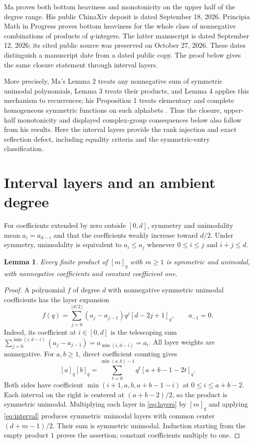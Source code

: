 \documentclass[11pt]{article}
\newtheorem{lemma}{Lemma}
\newcommand{\qi}[1]{[#1]_q}
\begin{document}
Ma \cite{Ma} proves both bottom heaviness and monotonicity
on the upper half of the degree range. His public ChinaXiv deposit is dated
September 18, 2026. Principia Math in Progress
\cite[Lemmas 1--2 and Theorem 1]{PM} proves bottom heaviness for the
whole class of nonnegative combinations of products of $q$-integers.
The latter manuscript is dated September 12, 2026; its cited public
source was preserved on October 27, 2026. These dates distinguish a
manuscript date from a dated public copy. The proof below gives the
same closure statement through interval layers.

More precisely, Ma's Lemma 2 treats any nonnegative sum of symmetric
unimodal polynomials, Lemma 3 treats their products, and Lemma 4 applies
this mechanism to recurrences; his Proposition 1 treats elementary and
complete homogeneous symmetric functions on such alphabets
\cite[pp.~8--12]{Ma}. Thus the closure, upper-half monotonicity and
displayed complex-group consequences below also follow from his results.
Here the interval layers provide the rank injection and exact reflection
defect, including equality criteria and the symmetric-entry classification.

\section{Interval layers and an ambient degree}
For coefficients extended by zero outside $[0,d]$, symmetry and
unimodality mean $a_i=a_{d-i}$ and that the coefficients weakly
increase toward $d/2$. Under symmetry, unimodality is equivalent to
$a_i\le a_j$ whenever
$0\le i\le j$ and $i+j\le d$.

\begin{lemma}\label{lem:products}
Every finite product of $\qi{m}$ with $m\ge1$ is symmetric and
unimodal, with nonnegative coefficients and constant coefficient one.
\end{lemma}
\begin{proof}
A polynomial $f$ of degree $d$ with nonnegative symmetric unimodal
coefficients has the layer expansion
\begin{equation}\label{eq:layers}
 f(q)=\sum_{j=0}^{\lfloor d/2\rfloor}
 (a_j-a_{j-1})q^j\qi{d-2j+1},\qquad a_{-1}=0.
\end{equation}
Indeed, its coefficient at $i\in[0,d]$ is the telescoping sum
$\sum_{j=0}^{\min(i,d-i)}(a_j-a_{j-1})=a_{\min(i,d-i)}=a_i$.
All layer weights are nonnegative. For $a,b\ge1$, direct coefficient
counting gives
\begin{equation}\label{eq:interval}
 \qi a\qi b=\sum_{t=0}^{\min(a,b)-1}q^t\qi{a+b-1-2t}.
\end{equation}
Both sides have coefficient $\min(i+1,a,b,a+b-1-i)$ at
$0\le i\le a+b-2$. Each interval on the right is centered at
$(a+b-2)/2$, so the product is symmetric unimodal.
Multiplying each layer in \eqref{eq:layers} by $\qi m$ and applying
\eqref{eq:interval} produces symmetric unimodal layers with common
center $(d+m-1)/2$. Their sum is symmetric unimodal.
Induction starting from the empty product $1$ proves the assertion;
constant coefficients multiply to one.
\end{proof}
\end{document}
